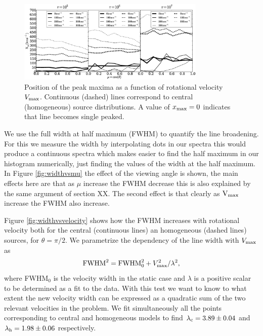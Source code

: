 \documentclass{emulateapj}
\begin{document}
\begin{figure}
\begin{center}
  \includegraphics[width=0.8\textwidth]{maxima.eps}
\end{center}
\caption{Position of the peak maxima as a function of rotational
  velocity $V_{\rm max}$. Continuous (dashed) lines correspond to
  central (homogeneous) source distributions. A value of $x_{\rm
    max}=0$ indicates that line becomes single
  peaked. \label{fig:maximumsvsvelocity}}  
\end{figure}



We use the full width at half maximum (FWHM) to quantify the line
broadening. For this we measure the width by interpolating dots in 
our spectra this would produce a continuous spectra which makes easier
to find the half maximum in our histogram numerically, just finding the 
values of the width at the half maximum. In Figure \ref{fig:widthvsmu}
the effect of the viewing angle is shown, the main effects here are that 
as $\mu$ increase the FWHM decrease this is also explained by the same argument
of section XX. The second effect is that clearly as $\rm{V_{max}}$ increase 
the FWHM also increase.



 Figure \ref{fig:widthvsvelocity} shows how the FWHM increases
with rotational velocity both for the central (continuous lines) an 
homogeneous (dashed lines) sources, for $\theta=\pi/2$.
 We parametrize the dependency of the line width with
$V_{\rm max}$ as
\begin{equation}
 {\rm FWHM}^2 = {\rm FWHM}_{0}^2 + V_{\rm max}^2/\lambda^2,
\label{eq:fwhm}
\end{equation}
%
where FWHM$_{0}$ is the velocity width in the static case and $\lambda$ 
is a positive scalar to be determined as a fit to the data. 
With this test we want to know
to what extent the new velocity width can be expressed as a quadratic
sum of the two relevant velocities in the problem. We fit
simultaneously all the points corresponding to central and homogeneous
models to find $\lambda_{\rm c} = 3.89 \pm 0.04$ and $\lambda_{\rm h}=
1.98\pm 0.06$ respectively. 
\end{document}
